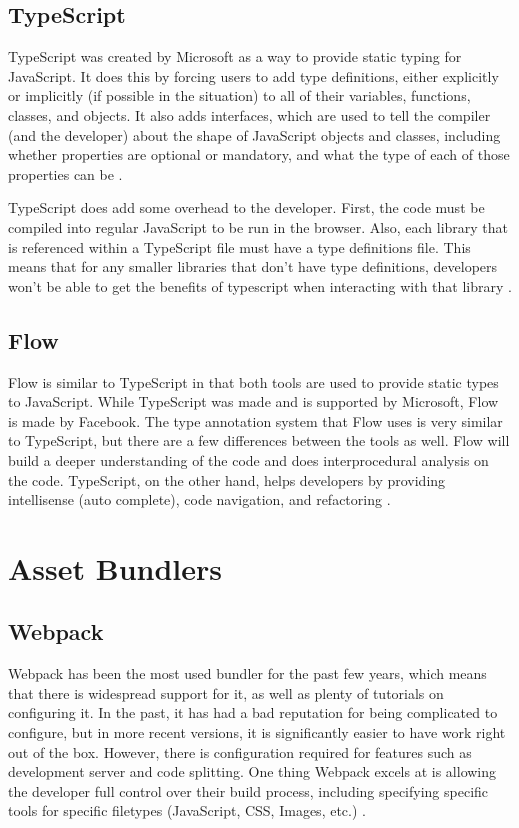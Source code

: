\documentclass[onecolumn, draftclsnofoot,10pt, compsoc]{IEEEtran}
\begin{document}
\subsection{TypeScript}
TypeScript was created by Microsoft as a way to provide static typing for JavaScript. It does this by forcing users to add type definitions, either explicitly or implicitly (if possible in the situation) to all of their variables, functions, classes, and objects. It also adds interfaces, which are used to tell the compiler (and the developer) about the shape of JavaScript objects and classes, including whether properties are optional or mandatory, and what the type of each of those properties can be \cite{ts_vs_flow}.

TypeScript does add some overhead to the developer. First, the code must be compiled into regular JavaScript to be run in the browser. Also, each library that is referenced within a TypeScript file must have a type definitions file. This means that for any smaller libraries that don't have type definitions, developers won't be able to get the benefits of typescript when interacting with that library \cite{ts_vs_flow}.

\subsection{Flow}
Flow is similar to TypeScript in that both tools are used to provide static types to JavaScript. While TypeScript was made and is supported by Microsoft, Flow is made by Facebook. The type annotation system that Flow uses is very similar to TypeScript, but there are a few differences between the tools as well. Flow will build a deeper understanding of the code and does interprocedural analysis on the code. TypeScript, on the other hand, helps developers by providing intellisense (auto complete), code navigation, and refactoring \cite{ts_vs_flow}.

\section{Asset Bundlers}
\subsection{Webpack}
Webpack has been the most used bundler for the past few years, which means that there is widespread support for it, as well as plenty of tutorials on configuring it. In the past, it has had a bad reputation for being complicated to configure, but in more recent versions, it is significantly easier to have work right out of the box. However, there is configuration required for features such as development server and code splitting. One thing Webpack excels at is allowing the developer full control over their build process, including specifying specific tools for specific filetypes (JavaScript, CSS, Images, etc.) \cite{bundlers}.
\end{document}
